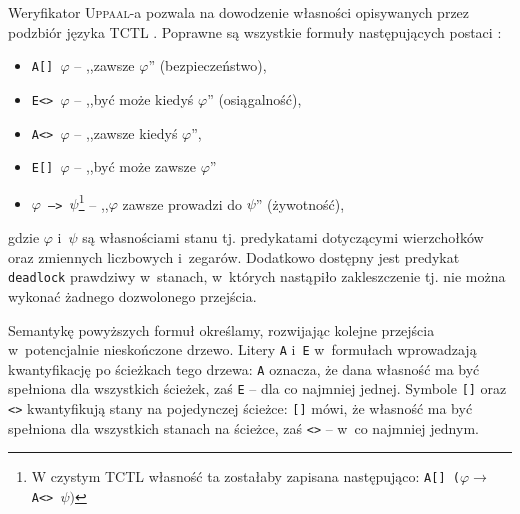 \documentclass{pracamgr}
\newcommand{\upp}{\textsc{Uppaal}}
\theoremstyle{plain}
\begin{document}
Weryfikator \upp-a pozwala na dowodzenie własności opisywanych przez
podzbiór języka TCTL \cite{acd:mc}. Poprawne są wszystkie formuły
następujących postaci \cite{by-lncs04}:
\begin{itemize}
  \item \texttt{A[] $\varphi$} -- ,,zawsze $\varphi$'' (bezpieczeństwo),
  \item \texttt{E<> $\varphi$} -- ,,być może kiedyś $\varphi$''
  (osiągalność),
  \item \texttt{A<> $\varphi$} -- ,,zawsze kiedyś $\varphi$'',
  \item \texttt{E[] $\varphi$} -- ,,być może zawsze $\varphi$''
  \item \texttt{$\varphi$ --> $\psi$}\footnote{W czystym TCTL własność
    ta zostałaby zapisana następująco: \texttt{A[]
      ($\varphi\rightarrow$ A<> $\psi)$}} -- ,,$\varphi$ zawsze
  prowadzi do $\psi$'' (żywotność),
\end{itemize}
gdzie $\varphi$ i~$\psi$ są własnościami stanu tj. predykatami
dotyczącymi wierzchołków oraz zmiennych liczbowych i~zegarów.
Dodatkowo dostępny jest predykat \texttt{deadlock} prawdziwy
w~stanach, w~których nastąpiło zakleszczenie tj. nie można wykonać
żadnego dozwolonego przejścia.

Semantykę powyższych formuł określamy, rozwijając kolejne
przejścia w~potencjalnie nieskończone drzewo. Litery \texttt{A}
i~\texttt{E} w~formułach wprowadzają kwantyfikację po ścieżkach tego drzewa:
\texttt{A} oznacza, że dana własność ma być spełniona dla wszystkich
ścieżek, zaś \texttt{E} -- dla co najmniej jednej. Symbole
\texttt{[]} oraz \texttt{<>} kwantyfikują stany na pojedynczej
ścieżce: \texttt{[]} mówi, że własność ma być spełniona dla wszystkich
stanach na ścieżce, zaś \texttt{<>} -- w~co najmniej jednym.
\end{document}
